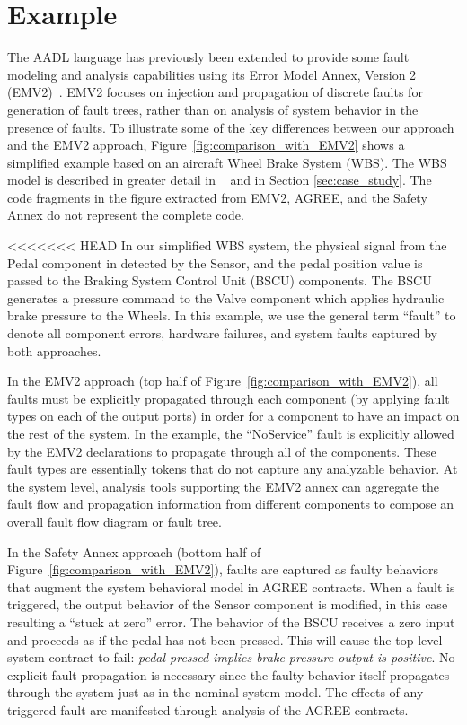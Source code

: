 \section{Example}
\label{sec:comparison_with_EMV2}

The AADL language has previously been extended to provide some fault modeling and analysis capabilities using its Error Model Annex, Version 2 (EMV2)~\cite{EMV2}.  EMV2 focuses on injection and propagation of discrete faults for generation of fault trees, rather than on analysis of system behavior in the presence of faults. 
To illustrate some of the key differences between our approach and the EMV2 approach, Figure~\ref{fig:comparison_with_EMV2} shows a simplified example based on an aircraft Wheel Brake System (WBS). The WBS model is described in greater detail in ~\cite{Stewart17:IMBSA} and in Section \ref{sec:case_study}. The code fragments in the figure extracted from EMV2, AGREE, and the Safety Annex do not represent the complete code.

<<<<<<< HEAD
In our simplified WBS system, the physical signal from the Pedal component in detected by the Sensor, and the pedal position value is passed to the Braking System Control Unit (BSCU) components.  The BSCU generates a pressure command to the Valve component which applies hydraulic brake pressure to the Wheels. In this example, we use the general term ``fault'' to denote all component errors, hardware failures, and system faults captured by both approaches.

In the EMV2 approach (top half of Figure~\ref{fig:comparison_with_EMV2}), all faults must be explicitly propagated through each component (by applying fault types on each of the output ports) in order for a component to have an impact on the rest of the system. In the example, the ``NoService'' fault is explicitly allowed by the EMV2 declarations to propagate through all of the components.  These fault types are essentially tokens that do not capture any analyzable behavior.  At the system level, analysis tools supporting the EMV2 annex can aggregate the fault flow and propagation information from different components to compose an overall fault flow diagram or fault tree.

In the Safety Annex approach (bottom half of Figure~\ref{fig:comparison_with_EMV2}), faults are captured as faulty behaviors that augment the system behavioral model in AGREE contracts.  When a fault is triggered, the output behavior of the Sensor component is modified, in this case resulting a ``stuck at zero'' error. The behavior of the BSCU receives a zero input and proceeds as if the pedal has not been pressed. This will cause the top level system contract to fail: {\em pedal pressed implies brake pressure output is positive}. No explicit fault propagation is necessary since the faulty behavior itself propagates through the system just as in the nominal system model. The effects of any triggered fault are manifested through analysis of the AGREE contracts. 


